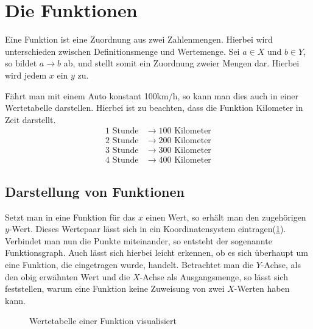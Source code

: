 \section{Die Funktionen}\label{sec:Die Funktion}
Eine Funktion ist eine Zuordnung aus zwei Zahlenmengen. Hierbei wird unterschieden zwischen Definitionsmenge und Wertemenge. Sei $a\in X$ und $b\in Y$, so bildet $a\rightarrow b$ ab, und stellt somit ein Zuordnung zweier Mengen dar. Hierbei wird jedem $x$ ein $y$ zu. 

\begin{beispiel} Fährt man mit einem Auto konstant 100km/h, so kann man dies auch in einer Wertetabelle darstellen. Hierbei ist zu beachten, dass die Funktion Kilometer in Zeit darstellt.
\begin{align*}
	1 \text{ Stunde}&\rightarrow100 \text{ Kilometer}\\
	2 \text{ Stunde}&\rightarrow200 \text{ Kilometer}\\
	3 \text{ Stunde}&\rightarrow300 \text{ Kilometer}\\
	4 \text{ Stunde}&\rightarrow400 \text{ Kilometer}
\end{align*}
\end{beispiel}
\subsection{Darstellung von Funktionen}\label{sec:Die Funktion/Darstellen von Funktionen}
Setzt man in eine Funktion für das $x$ einen Wert, so erhält man den zugehörigen $y$-Wert. Dieses Wertepaar lässt sich in ein Koordinatensystem eintragen(\ref{sec:Wertetabelle_einer_Funktion_visualisiert}). Verbindet man nun die Punkte miteinander, so entsteht der sogenannte Funktionsgraph. Auch lässt sich hierbei leicht erkennen, ob es sich überhaupt um eine Funktion, die eingetragen wurde, handelt. Betrachtet man die $Y$-Achse, als den obig erwähnten Wert und die $X$-Achse als Ausgangsmenge, so lässt sich feststellen, warum eine Funktion keine Zuweisung von zwei $X$-Werten haben kann.
\begin{figure}[h!]
\centering
{}
\caption{Wertetabelle einer Funktion visualisiert}
\label{sec:Wertetabelle_einer_Funktion_visualisiert}
\end{figure}

 
